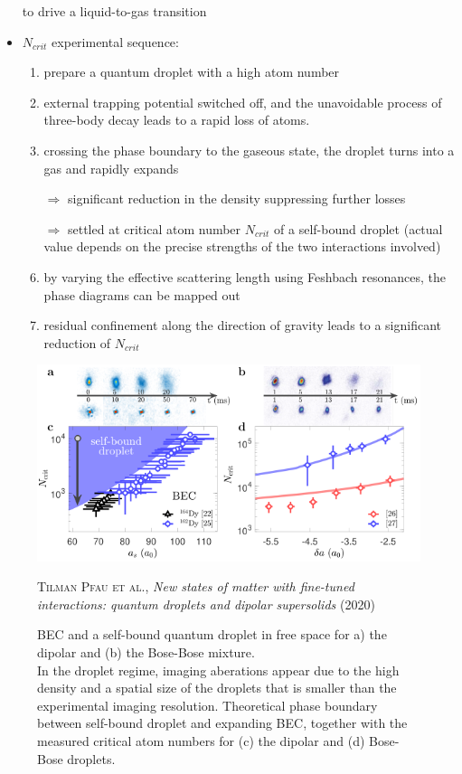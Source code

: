 \begin{itemize}
        to drive a liquid-to-gas transition
    \item $N_{crit}$ experimental sequence:
        \begin{enumerate}
            \item prepare a quantum droplet with a high atom number
            \item external trapping potential switched off, and the unavoidable process of three-body decay
                leads to a rapid loss of atoms.
            \item crossing the phase boundary to the gaseous state, the droplet turns into a gas and
                rapidly expands
            \item[$\Rightarrow$] significant reduction in the density suppressing further losses
            \item[$\Rightarrow$] settled at critical atom number $N_{crit}$ of a self-bound droplet
                (actual value depends on the precise strengths of the two interactions involved)
            \item by varying the effective scattering length using Feshbach resonances, the phase diagrams can
                be mapped out
            \item residual confinement along the direction of gravity leads to a significant reduction of $N_{crit}$
        \end{enumerate}
\end{itemize}

\begin{figure}[H]
    \centering
    \includegraphics[width=1.0\textwidth]{IMAGE/self_bound.png}\\
    \caption{
            BEC and a self-bound quantum droplet in free space for a) the dipolar and (b) the Bose-Bose mixture. \\
            In the droplet regime, imaging aberations appear due to the high density and a spatial size of the
            droplets that is smaller than the experimental imaging resolution.
            Theoretical phase boundary between self-bound droplet and expanding BEC,
            together with the measured critical atom numbers for (c) the dipolar and (d) Bose-Bose droplets.
      }
    \textsc{Tilman Pfau et al.}, \emph{New states of matter with fine-tuned interactions: quantum droplets
        and dipolar supersolids} (2020)
    \label{fig:self_bound}
\end{figure}

